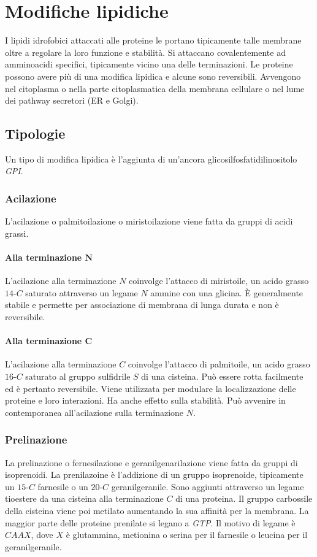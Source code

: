 \section{Modifiche lipidiche}
I lipidi idrofobici attaccati alle proteine le portano tipicamente talle membrane oltre a regolare la loro funzione e stabilit\`a.
Si attaccano covalentemente ad amminoacidi specifici, tipicamente vicino una delle terminazioni. 
Le proteine possono avere pi\`u di una modifica lipidica e alcune sono reversibili.
Avvengono nel citoplasma o nella parte citoplasmatica della membrana cellulare o nel lume dei pathway secretori (ER e Golgi).
	
	\subsection{Tipologie}
	Un tipo di modifica lipidica \`e l'aggiunta di un'ancora glicosilfosfatidilinositolo \emph{GPI}.

		\subsubsection{Acilazione}
		L'acilazione o palmitoilazione o miristoilazione viene fatta da gruppi di acidi grassi.
			
			\paragraph{Alla terminazione $\mathbf{N}$}
			L'acilazione alla terminazione $N$ coinvolge l'attacco di miristoile, un acido grasso $14$-$C$ saturato attraverso un legame $N$ ammine con una glicina. 
			\`E generalmente stabile e permette per associazione di membrana di lunga durata e non \`e reversibile.

			\paragraph{Alla terminazione $\mathbf{C}$}
			L'acilazione alla terminazione $C$ coinvolge l'attacco di palmitoile, un acido grasso $16$-$C$ saturato al gruppo sulfidrile $S$ di una cisteina. 
			Pu\`o essere rotta facilmente ed \`e pertanto reversibile.
			Viene utilizzata per modulare la localizzazione delle proteine e loro interazioni.
			Ha anche effetto sulla stabilit\`a. 
			Pu\`o avvenire in contemporanea all'acilazione sulla terminazione $N$.

		\subsubsection{Prelinazione}
		La prelinazione o fernesilazione e geranilgenarilazione viene fatta da gruppi di isoprenoidi.
		La prenilazoine \`e l'addizione di un gruppo isoprenoide, tipicamente un $15$-$C$ farnesile o un $20$-$C$ geranilgeranile. 
		Sono aggiunti attraverso un legame tioestere da una cisteina alla terminazione $C$ di una proteina.
		Il gruppo carbossile della cisteina viene poi metilato aumentando la sua affinit\`a per la membrana.
		La maggior parte delle proteine prenilate si legano a \emph{GTP}. 
		Il motivo di legame \`e $CAAX$, dove $X$ \`e glutammina, metionina o serina per il farnesile o leucina per il geranilgeranile. 

